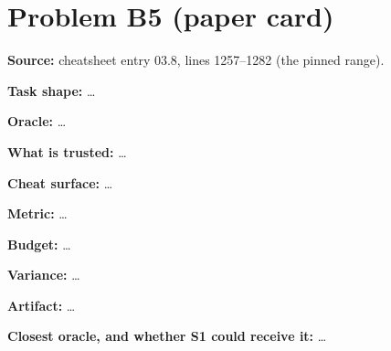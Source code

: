 \documentclass[11pt]{article}
\begin{document}
\section*{Problem B5 (paper card)}\label{ans:B5}
\begin{answer}
\textbf{Source:} cheatsheet entry 03.8, lines 1257--1282 (the pinned range).

\textbf{Task shape:} \dots

\textbf{Oracle:} \dots

\textbf{What is trusted:} \dots

\textbf{Cheat surface:} \dots

\textbf{Metric:} \dots

\textbf{Budget:} \dots

\textbf{Variance:} \dots

\textbf{Artifact:} \dots

\textbf{Closest oracle, and whether S1 could receive it:} \dots
\end{answer}
\end{document}
